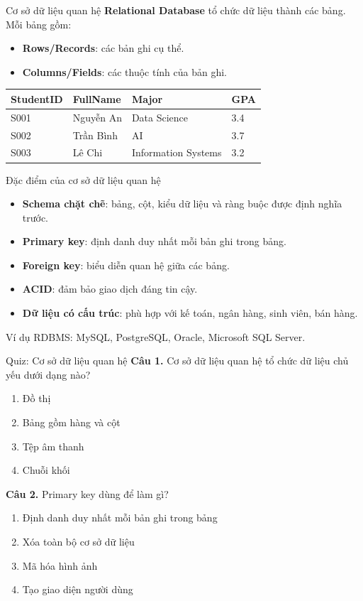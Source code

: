 ﻿\documentclass[aspectratio=169,11pt]{beamer}
\newcommand{\keyword}[1]{\textcolor{accent}{\textbf{#1}}}
\newcommand{\tightlist}{\setlength{\itemsep}{2pt}\setlength{\parskip}{0pt}}
\newcommand{\qoption}[2]{\item[#1.] #2}
\begin{document}
\begin{frame}{Cơ sở dữ liệu quan hệ}
\small
\keyword{Relational Database} tổ chức dữ liệu thành các bảng. Mỗi bảng gồm:
\begin{itemize}
\tightlist
  \item \textbf{Rows/Records}: các bản ghi cụ thể.
  \item \textbf{Columns/Fields}: các thuộc tính của bản ghi.
\end{itemize}

\begin{table}[]
\centering
\scriptsize
\begin{tabular}{llll}
\toprule
StudentID & FullName & Major & GPA \\
\midrule
S001 & Nguyễn An & Data Science & 3.4 \\
S002 & Trần Bình & AI & 3.7 \\
S003 & Lê Chi & Information Systems & 3.2 \\
\bottomrule
\end{tabular}
\end{table}
\end{frame}

\begin{frame}{Đặc điểm của cơ sở dữ liệu quan hệ}
\small
\begin{itemize}
\tightlist
  \item \textbf{Schema chặt chẽ}: bảng, cột, kiểu dữ liệu và ràng buộc được định nghĩa trước.
  \item \textbf{Primary key}: định danh duy nhất mỗi bản ghi trong bảng.
  \item \textbf{Foreign key}: biểu diễn quan hệ giữa các bảng.
  \item \textbf{ACID}: đảm bảo giao dịch đáng tin cậy.
  \item \textbf{Dữ liệu có cấu trúc}: phù hợp với kế toán, ngân hàng, sinh viên, bán hàng.
\end{itemize}

Ví dụ RDBMS: MySQL, PostgreSQL, Oracle, Microsoft SQL Server.
\end{frame}

\begin{frame}{Quiz: Cơ sở dữ liệu quan hệ}
\small
\textbf{Câu 1.} Cơ sở dữ liệu quan hệ tổ chức dữ liệu chủ yếu dưới dạng nào?
\begin{enumerate}
\tightlist
  \qoption{A}{Đồ thị}
  \qoption{B}{Bảng gồm hàng và cột}
  \qoption{C}{Tệp âm thanh}
  \qoption{D}{Chuỗi khối}
\end{enumerate}

\textbf{Câu 2.} Primary key dùng để làm gì?
\begin{enumerate}
\tightlist
  \qoption{A}{Định danh duy nhất mỗi bản ghi trong bảng}
  \qoption{B}{Xóa toàn bộ cơ sở dữ liệu}
  \qoption{C}{Mã hóa hình ảnh}
  \qoption{D}{Tạo giao diện người dùng}
\end{enumerate}
\end{frame}
\end{document}
